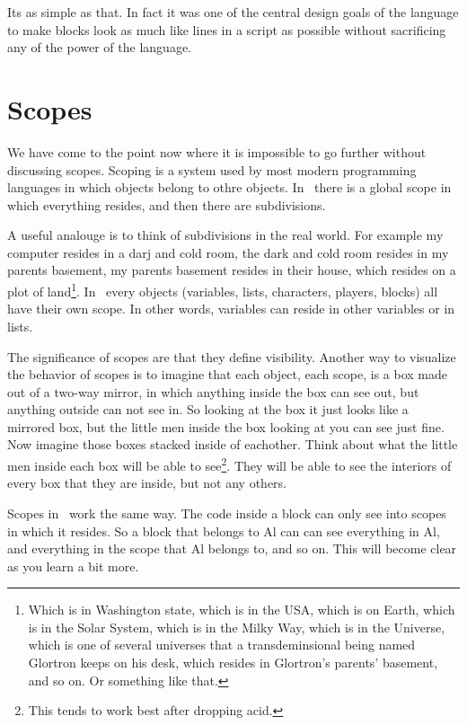 \documentclass{book}
\begin{document}
Its as simple as that.  In fact it was one of the central design goals of the language to make blocks look as much like lines in a script as possible without sacrificing any of the power of the language.

\section{Scopes}

We have come to the point now where it is impossible to go further without discussing scopes.  Scoping is a system used by most modern programming languages in which objects belong to othre objects.  In \SSquared\ there is a global scope in which everything resides, and then there are subdivisions.

A useful analouge is to think of subdivisions in the real world.  For example my computer resides in a darj and cold room, the dark and cold room resides in my parents basement, my parents basement resides in their house, which resides on a plot of land\footnote{Which is in Washington state, which is in the USA, which is on Earth, which is in the Solar System, which is in the Milky Way, which is in the Universe, which is one of several universes that a transdeminsional being named Glortron keeps on his desk, which resides in Glortron's parents' basement, and so on.  Or something like that.}.  In \SSquared\ every objects (variables, lists, characters, players, blocks) all have their own scope.  In other words, variables can reside in other variables or in lists.

The significance of scopes are that they define visibility.  Another way to visualize the behavior of scopes is to imagine that each object, each scope, is a box made out of a two-way mirror, in which anything inside the box can see out, but anything outside can not see in.  So looking at the box it just looks like a mirrored box, but the little men inside the box looking at you can see just fine.  Now imagine those boxes stacked inside of eachother.  Think about what the little men inside each box will be able to see\footnote{This tends to work best after dropping acid.}.  They will be able to see the interiors of every box that they are inside, but not any others.

Scopes in \SSquared\ work the same way.  The code inside a block can only see into scopes in which it resides.  So a block that belongs to Al can can see everything in Al, and everything in the scope that Al belongs to, and so on.  This will become clear as you learn a bit more.
\end{document}
